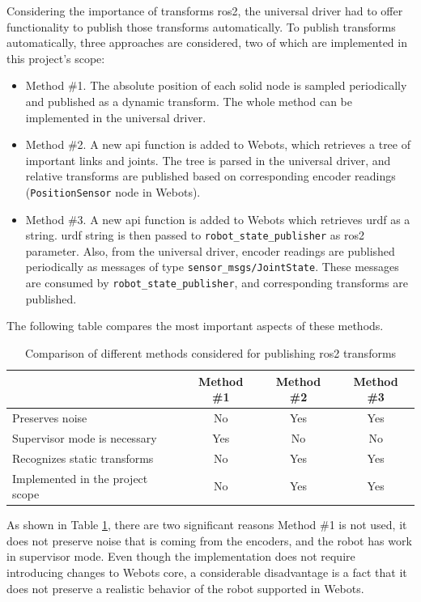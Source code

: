 Considering the importance of transforms \ac{ros2}, the universal driver had to offer functionality to publish those transforms automatically.
To publish transforms automatically, three approaches are considered, two of which are implemented in this project's scope:
\begin{itemize}
    \item Method \#1. The absolute position of each solid node is sampled periodically and published as a dynamic transform. The whole method can be implemented in the universal driver.
    \item Method \#2. A new \ac{api} function is added to Webots, which retrieves a tree of important links and joints. The tree is parsed in the universal driver, and relative transforms are published based on corresponding encoder readings (\texttt{PositionSensor} node in Webots). 
    \item Method \#3. A new \ac{api} function is added to Webots which retrieves \ac{urdf} as a string. \ac{urdf} string is then passed to \texttt{robot\_state\_publisher} as \ac{ros2} parameter. Also, from the universal driver, encoder readings are published periodically as messages of type \texttt{sensor\_msgs/JointState}. These messages are consumed by \texttt{robot\_state\_publisher}, and corresponding transforms are published.
\end{itemize}

The following table compares the most important aspects of these methods.

\begin{table}[H]
    \centering
    \begin{tabular}{|l|c|c|c|}
        \hline
        & Method \#1 & Method \#2 & Method \#3  \\
        \hline
        Preserves noise & No & Yes & Yes \\
        \hline
        Supervisor mode is necessary & Yes & No & No \\
        \hline
        Recognizes static transforms & No & Yes & Yes \\
        \hline
        Implemented in the project scope & No & Yes & Yes \\
        \hline
    \end{tabular}
    \caption{Comparison of different methods considered for publishing \ac{ros2} transforms}
    \label{tab:generalization:transforms_comparison}
\end{table}

As shown in Table \ref{tab:generalization:transforms_comparison}, there are two significant reasons Method \#1 is not used, it does not preserve noise that is coming from the encoders, and the robot has work in supervisor mode.
Even though the implementation does not require introducing changes to Webots core, a considerable disadvantage is a fact that it does not preserve a realistic behavior of the robot supported in Webots.


